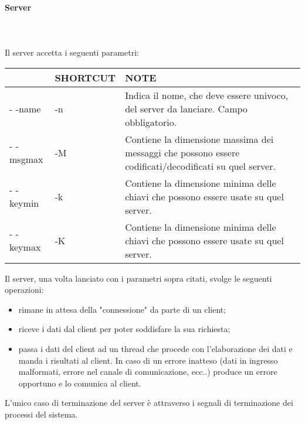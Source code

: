 \documentclass[12pt]{article}
\begin{document}
\paragraph{Server} \mbox{}\\ \\
Il server accetta i seguenti parametri:\\

\begin{center}
    \begin{tabular}{| >{\centering\arraybackslash}m{2.5cm} | >{\centering\arraybackslash}m{2.5cm} | m{9cm}|}
    \hline
    {\bf OPZIONE} & {\bf SHORTCUT} & {\bf NOTE}\\ \hline
    - -name & -n & Indica il nome, che deve essere univoco, del server da lanciare. Campo obbligatorio. \\ \hline
   	- -msgmax & -M & Contiene la dimensione massima dei messaggi che possono essere codificati/decodificati su quel server.\\ \hline
   	- -keymin & -k & Contiene la dimensione minima delle chiavi che possono essere usate su quel server.\\ \hline
   	- -keymax & -K & Contiene la dimensione minima delle chiavi che possono essere usate su quel server.\\
    \hline

  \end{tabular}  
  \end{center}

\noindent Il server, una volta lanciato con i parametri sopra citati, svolge le seguenti operazioni:
\begin{itemize}
    \item rimane in attesa della "connessione" da parte di un client;
    \item riceve i dati dal client per poter soddisfare la sua richiesta;
    \item passa i dati del client ad un thread che procede con l'elaborazione dei dati e manda i risultati al client. In caso di un errore inatteso (dati in ingresso malformati, errore nel canale di comunicazione, ecc..) produce un errore opportuno e lo comunica al client.
\end{itemize}
L'unico caso di terminazione del server è attraverso i segnali di terminazione dei processi del sistema.
\end{document}
